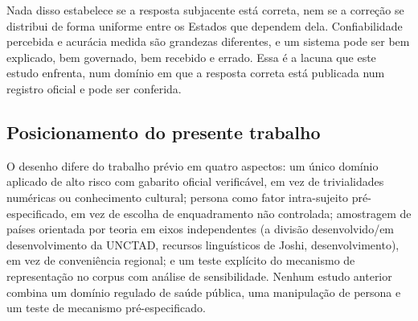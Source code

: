 Nada disso estabelece se a resposta subjacente está correta, nem se a correção
se distribui de forma uniforme entre os Estados que dependem dela.
Confiabilidade percebida e acurácia medida são grandezas diferentes, e um
sistema pode ser bem explicado, bem governado, bem recebido e errado. Essa é a
lacuna que este estudo enfrenta, num domínio em que a resposta correta está
publicada num registro oficial e pode ser conferida.

\subsection{Posicionamento do presente trabalho}

O desenho difere do trabalho prévio em quatro aspectos: um único domínio
aplicado de alto risco com gabarito oficial verificável, em vez de trivialidades
numéricas ou conhecimento cultural; persona como fator intra-sujeito
pré-especificado, em vez de escolha de enquadramento não controlada; amostragem
de países orientada por teoria em eixos independentes (a divisão
desenvolvido/em desenvolvimento da UNCTAD, recursos linguísticos de Joshi,
desenvolvimento), em vez de conveniência regional; e um teste explícito do
mecanismo de representação no corpus com análise de sensibilidade. Nenhum
estudo anterior combina um domínio regulado de saúde pública, uma manipulação
de persona e um teste de mecanismo pré-especificado.
